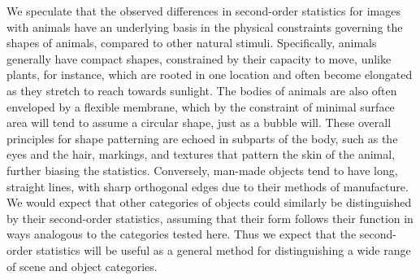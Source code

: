 \documentclass[a4paper]{article}
\begin{document}
We speculate that the observed differences in second-order statistics for images
with animals have an underlying basis in the physical constraints 
governing the shapes of animals, compared to other natural stimuli. 
Specifically, animals generally have compact shapes, constrained by their capacity to move, 
unlike plants, for instance, which are rooted in one location 
and often become elongated as they stretch to reach towards sunlight. 
The bodies of animals are also often enveloped by a flexible membrane, 
which by the constraint of minimal surface area will tend to assume a circular shape, 
just as a bubble will. 
These overall principles for shape patterning are echoed in subparts of the body, 
such as the eyes and the hair, markings, and textures that pattern the skin of the animal, 
further biasing the statistics. 
Conversely, man-made objects tend to have long, straight lines, 
with sharp orthogonal edges due to their methods of manufacture. 
We would expect that other categories of objects could similarly be
distinguished by their second-order statistics, 
assuming that their form %
follows their function in ways analogous to the categories tested
here.  Thus we expect that the second-order statistics will be useful
as a general method for distinguishing a wide range of scene and
object categories.
\end{document}
